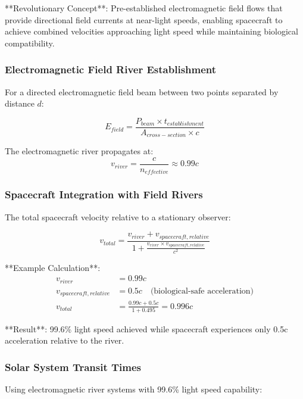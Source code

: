 \documentclass[12pt,a4paper]{article}
\theoremstyle{remark}
\begin{document}
**Revolutionary Concept**: Pre-established electromagnetic field flows that provide directional field currents at near-light speeds, enabling spacecraft to achieve combined velocities approaching light speed while maintaining biological compatibility.

\subsubsection{Electromagnetic Field River Establishment}

For a directed electromagnetic field beam between two points separated by distance $d$:

\begin{equation}
E_{field} = \frac{P_{beam} \times t_{establishment}}{A_{cross-section} \times c}
\end{equation}

The electromagnetic river propagates at:
\begin{equation}
v_{river} = \frac{c}{n_{effective}} \approx 0.99c
\end{equation}

\subsubsection{Spacecraft Integration with Field Rivers}

The total spacecraft velocity relative to a stationary observer:

\begin{equation}
v_{total} = \frac{v_{river} + v_{spacecraft,relative}}{1 + \frac{v_{river} \times v_{spacecraft,relative}}{c^2}}
\end{equation}

**Example Calculation**:
\begin{align}
v_{river} &= 0.99c \\
v_{spacecraft,relative} &= 0.5c \quad \text{(biological-safe acceleration)} \\
v_{total} &= \frac{0.99c + 0.5c}{1 + 0.495} = 0.996c
\end{align}

**Result**: 99.6\% light speed achieved while spacecraft experiences only 0.5c acceleration relative to the river.

\subsubsection{Solar System Transit Times}

Using electromagnetic river systems with 99.6\% light speed capability:
\end{document}
